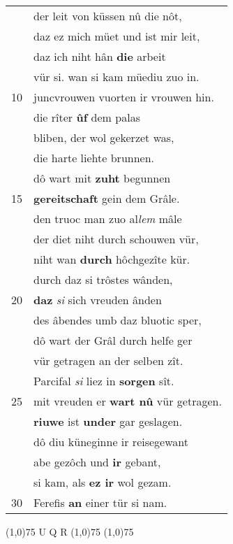 \documentclass[8pt,a4paper,notitlepage]{article}
\begin{document}
\begin{table}[ht]
\begin{minipage}[t]{0.5\linewidth}
\begin{tabular}{rl}
 & der leit von küssen nû die nôt,\\ 
 & daz ez mich müet und ist mir leit,\\ 
 & daz ich niht hân \textbf{die} arbeit\\ 
 & vür si. wan si kam müediu zuo in.\\ 
10 & juncvrouwen vuorten ir vrouwen hin.\\ 
 & die rîter \textbf{ûf} dem palas\\ 
 & bliben, der wol gekerzet was,\\ 
 & die harte liehte brunnen.\\ 
 & dô wart mit \textbf{zuht} begunnen\\ 
15 & \textbf{gereitschaft} gein dem Grâle.\\ 
 & den truoc man zuo al\textit{lem} mâle\\ 
 & der diet niht durch schouwen vür,\\ 
 & niht wan \textbf{durch} hôchgezîte kür.\\ 
 & durch daz si trôstes wânden,\\ 
20 & \textbf{daz} \textit{si} sich vreuden ânden\\ 
 & des âbendes umb daz bluotic sper,\\ 
 & dô wart der Grâl durch helfe ger\\ 
 & vür getragen an der selben zît.\\ 
 & Parcifal \textit{si} liez in \textbf{sorgen} sît.\\ 
25 & mit vreuden er \textbf{wart nû} vür getragen.\\ 
 & \textbf{riuwe} ist \textbf{under} gar geslagen.\\ 
 & dô diu küneginne ir reisegewant\\ 
 & abe gezôch und \textbf{ir} gebant,\\ 
 & si kam, als \textbf{ez ir} wol gezam.\\ 
30 & Ferefis \textbf{an} einer tür si nam.\\ 
\end{tabular}
\scriptsize
\line(1,0){75} \newline
U Q R \newline
\line(1,0){75} \newline
\newline
\line(1,0){75} \newline

\end{minipage}
\end{table}
\end{document}
